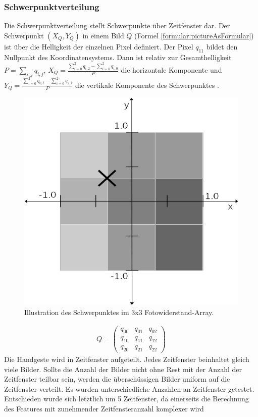 \subsubsection{Schwerpunktverteilung}
\label{sec:schwerpunktverteilung}
Die Schwerpunktverteilung stellt Schwerpunkte über Zeitfenster dar. Der Schwerpunkt $(X_Q, Y_Q)$ in einem Bild $Q$ (Formel \ref{formular:pictureAsFormular}) ist über die Helligkeit der einzelnen
Pixel definiert. Der Pixel $q_{11}$ bildet den Nullpunkt des Koordinatensystems. Dann ist relativ zur Gesamthelligkeit $P = \sum_{i,j} q_{i,j}$, $X_Q=\frac{\sum_{i=0}^{2} q_{i,2} - \sum_{i=0}^{2} q_{i,0}}{P}$
die horizontale Komponente und $Y_Q = \frac{\sum_{i=0}^{2} q_{0,i} - \sum_{i=0}^{2} q_{2,i}}{P}$ die vertikale Komponente des Schwerpunktes \cite{schwerpunktAnsatz}.
\begin{figure}
    \centering
    \includegraphics[width=0.5\linewidth]{images/schwerpunkt_ansatz.jpg}
    \caption{Illustration des Schwerpunktes im 3x3 Fotowiderstand-Array.}
    \label{fig:schwerpunkt}
\end{figure}
\begin{align}
    Q = \begin{pmatrix}
            q_{00} & q_{01} & q_{02} \\
            q_{10} & q_{11} & q_{12} \\
            q_{20} & q_{21} & q_{22}
    \end{pmatrix}
    \label{formular:pictureAsFormular}
\end{align}
Die Handgeste wird in Zeitfenster aufgeteilt. Jedes Zeitfenster beinhaltet gleich viele Bilder. Sollte die Anzahl der Bilder nicht ohne Rest mit der Anzahl der Zeitfenster teilbar sein, werden die
überschüssigen Bilder uniform auf die Zeitfenster verteilt.
\newline
\newline
Es wurden unterschiedliche Anzahlen an Zeitfenster getestet. Entschieden wurde sich letztlich um 5 Zeitfenster, da einerseits die Berechnung des Features mit zunehmender Zeitfensteranzahl komplexer wird
